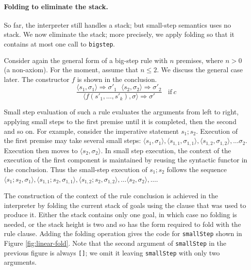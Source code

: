 \documentclass{llncs}
\begin{document}
\paragraph{Folding to eliminate the stack.}  So far, the interpreter still handles a stack; but small-step semantics
uses no stack.  We now eliminate the stack;  more precisely, we apply folding so that it
contains at most one call to \texttt{bigstep}.

Consider again the general form of a big-step rule with $n$ premises, where $n>0$ (a non-axiom).  For the moment,
assume that $n\le 2$.  We discuss the general case later. The constructor $f$ is shown in
the conclusion.  
\[
\dfrac{\langle s_1, \sigma_1\rangle \Longrightarrow \sigma'_1 ~~~\langle s_2, \sigma_2\rangle \Longrightarrow \sigma'_2}
{\langle f(s'_1,\ldots,s'_k), \sigma\rangle \Longrightarrow \sigma'} 
~~~~\mathrm{if }~ c
\]



Small step evaluation of such a rule evaluates the arguments from left to right, applying small steps to the first premise until it
is completed, then the second and so on. For example, consider the imperative statement $s_1;s_2$. Execution of the
first premise may take several small steps: $\langle s_1, \sigma_1\rangle, \langle s_{1,1}, \sigma_{1,1}\rangle, \langle s_{1,2}, \sigma_{1,2}\rangle, \ldots \sigma_2$.
Execution then moves to $\langle s_2, \sigma_2\rangle$.  
In small step execution, the context of the execution of the first component is
maintained by reusing the syntactic functor in the conclusion. Thus the small-step execution of $s_1;s_2$ follows the sequence
$\langle s_1;s_2, \sigma_1\rangle, \langle s_{1,1};s_2, \sigma_{1,1}\rangle, \langle s_{1,2};s_2, \sigma_{1,2}\rangle, \ldots \langle s_2,\sigma_2\rangle,\ldots$.

The construction of the context of the rule conclusion is achieved in the interpreter by folding the current stack of goals using the 
clause that was used to produce it. Either the stack contains only one goal, in which case no folding is needed, or
the stack height is two and so has the form required to fold with the rule clause.
Adding the folding operation gives the code for \texttt{smallStep} shown in Figure \ref{fig:linear-fold}. 
Note that the second argument of \texttt{smallStep} in the previous figure is always \texttt{[]}; we
omit it leaving \texttt{smallStep} with only two arguments.
\end{document}
